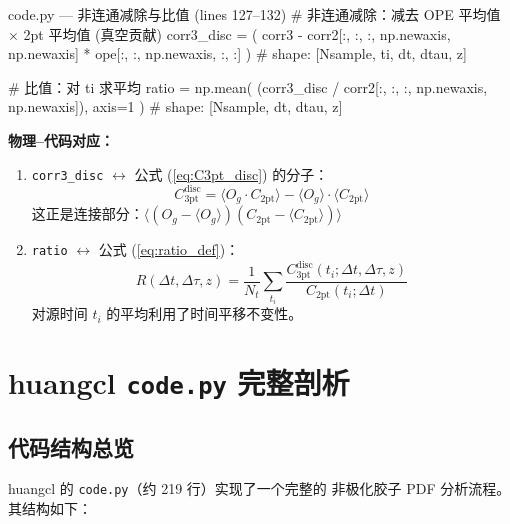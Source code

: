 \documentclass[12pt,a4paper]{ctexart}
\begin{document}
\begin{codeblock}{code.py --- 非连通减除与比值 (lines 127--132)}
# 非连通减除：减去 OPE 平均值 × 2pt 平均值 (真空贡献)
corr3_disc = (
    corr3 - corr2[:, :, :, np.newaxis, np.newaxis]
          * ope[:, :, np.newaxis, :, :]
)
# shape: [Nsample, ti, dt, dtau, z]

# 比值：对 ti 求平均
ratio = np.mean(
    (corr3_disc / corr2[:, :, :, np.newaxis, np.newaxis]),
    axis=1
)
# shape: [Nsample, dt, dtau, z]
\end{codeblock}

\textbf{物理--代码对应：}

\begin{enumerate}
    \item \texttt{corr3\_disc} $\longleftrightarrow$ 公式 (\ref{eq:C3pt_disc}) 的分子：
        \begin{equation*}
        C^{\text{disc}}_{\text{3pt}} = \langle O_g \cdot C_{\text{2pt}} \rangle
            - \langle O_g \rangle \cdot \langle C_{\text{2pt}} \rangle
        \end{equation*}
        这正是连接部分：$\langle (O_g - \langle O_g \rangle)
        (C_{\text{2pt}} - \langle C_{\text{2pt}} \rangle) \rangle$

    \item \texttt{ratio} $\longleftrightarrow$ 公式 (\ref{eq:ratio_def})：
        \begin{equation*}
        R(\Delta t, \Delta\tau, z) = \frac{1}{N_t} \sum_{t_i}
            \frac{C^{\text{disc}}_{\text{3pt}}(t_i; \Delta t, \Delta\tau, z)}
                 {C_{\text{2pt}}(t_i; \Delta t)}
        \end{equation*}
        对源时间 $t_i$ 的平均利用了时间平移不变性。
\end{enumerate}


\section{huangcl \texttt{code.py} 完整剖析}\label{sec:huangcl}

\subsection{代码结构总览}

huangcl 的 \texttt{code.py}（约 219 行）实现了一个完整的
非极化胶子 PDF 分析流程。其结构如下：
\end{document}
